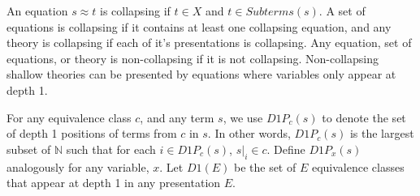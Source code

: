 An equation $s  \approx  t$ is collapsing if $t \in X$ and $t \in Subterms(s)$.
A set of equations is collapsing if it contains at least one collapsing equation, and any theory is collapsing if each of it's presentations is collapsing.   %
Any equation, set of equations, or theory is non-collapsing if it is not collapsing.
Non-collapsing shallow theories can be presented by equations where variables only appear at depth 1.

For any equivalence class $c$, and any term $s$, we use $D1P_c(s)$ to denote the set of depth 1 positions of terms from $c$ in $s$.
In other words, $D1P_c(s)$ is the largest  subset of  $\mathbb{N}$ such that for each $i \in  D1P_c(s)$, $s|_i \in c$. 
Define $D1P_x(s)$ analogously for any variable, $x$. 
Let $D1(E)$ be the set of $E$ equivalence classes that appear at depth 1 in any presentation $E$.
